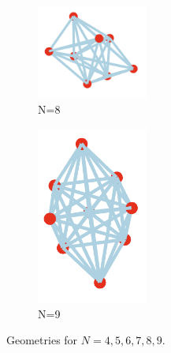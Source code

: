 \documentclass[11pt,onecolumn]{article}
\begin{document}
\begin{figure}[h]
  \begin{subfigure}[b]{0.4\textwidth}
    \centering
    \includegraphics[width=0.4\textwidth]{N8.png}
    \caption{N=8}
    \label{fig:sub3}
  \end{subfigure}
  \hfill
  \begin{subfigure}[b]{0.4\textwidth}
    \centering
    \includegraphics[width=0.4\textwidth]{N9.png}
    \caption{N=9}
    \label{fig:sub4}
  \end{subfigure}

  \caption{Geometries for $N=4,5,6,7,8,9$.}
  \label{fig:grid}
\end{figure}


\newpage
\end{document}
